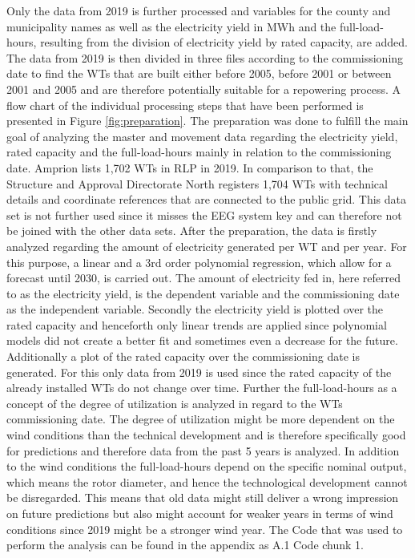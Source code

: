 \documentclass[a4paper,11pt]{article}
\begin{document}
Only the data from 2019 is further processed and variables for the county and municipality names as well as the electricity yield in MWh and the full-load-hours, resulting from the division of electricity yield by rated capacity, are added. The data from 2019 is then divided in three files according to the commissioning date to find the WTs that are built either before 2005, before 2001 or between 2001 and 2005 and are therefore potentially suitable for a repowering process. A flow chart of the individual processing steps that have been performed is presented in Figure \ref{fig:preparation}. The preparation was done to fulfill the main goal of analyzing the master and movement data regarding the electricity yield, rated capacity and the full-load-hours mainly in relation to the commissioning date. Amprion lists 1,702 WTs in RLP in 2019. In comparison to that, the Structure and Approval Directorate North registers 1,704 WTs with technical details and coordinate references that are connected to the public grid. This data set is not further used since it misses the EEG system key and can therefore not be joined with the other data sets. After the preparation, the data is firstly analyzed regarding the amount of electricity generated per WT and per year. For this purpose, a linear and a 3rd order polynomial regression, which allow for a forecast until 2030, is carried out. The amount of electricity fed in, here referred to as the electricity yield, is the dependent variable and the commissioning date as the independent variable. Secondly the electricity yield is plotted over the rated capacity and henceforth only linear trends are applied since polynomial models did not create a better fit and sometimes even a decrease for the future. Additionally a plot of the rated capacity over the commissioning date is generated. For this only data from 2019 is used since the rated capacity of the already installed WTs do not change over time. Further the full-load-hours as a concept of the degree of utilization is analyzed in regard to the WTs commissioning date. The degree of utilization might be more dependent on the wind conditions than the technical development and is therefore specifically good for predictions and therefore data from the past 5 years is analyzed. In addition to the wind conditions the full-load-hours depend on the specific nominal output, which means the rotor diameter, and hence the technological development cannot be disregarded. This means that old data might still deliver a wrong impression on future predictions but also might account for weaker years in terms of wind conditions since 2019 might be a stronger wind year. The Code that was used to perform the analysis can be found in the appendix as A.1 Code chunk 1.
\end{document}
